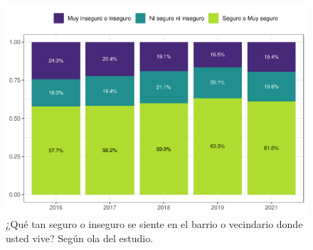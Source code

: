 \documentclass[
  12pt,
]{book}
\begin{document}
\begin{figure}

{\centering \includegraphics{reporte-elsoc_files/figure-latex/seguri-ola-1} 

}

\caption{¿Qué tan seguro o inseguro se siente en el barrio o vecindario donde usted vive? Según ola del estudio.}\label{fig:seguri-ola}
\end{figure}
\end{document}
